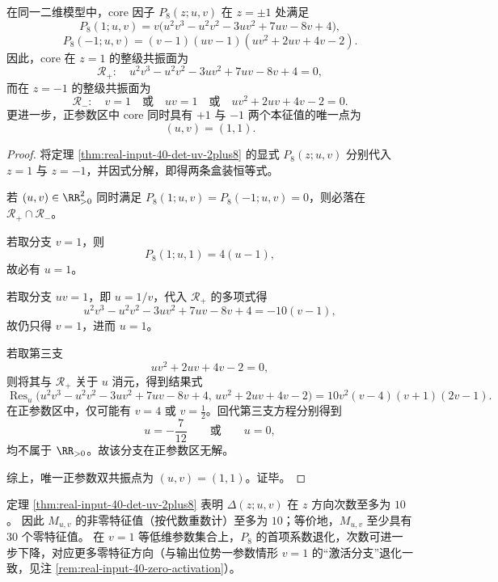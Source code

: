 \begin{theorem}[core 在 \texorpdfstring{$z=\pm1$}{z=±1} 的整级共振面与唯一正双共振点]\label{thm:real-input-40-zeta-uv-core-zpmone-resonance-surfaces}
在同一二维模型中，core 因子 \(P_8(z;u,v)\) 在 \(z=\pm1\) 处满足
\[
\boxed{\;
P_8(1;u,v)
=
v\bigl(u^2v^3-u^2v^2-3uv^2+7uv-8v+4\bigr),
\;}
\]
\[
\boxed{\;
P_8(-1;u,v)
=
(v-1)(uv-1)(uv^2+2uv+4v-2).
\;}
\]
因此，core 在 \(z=1\) 的整级共振面为
\[
\mathcal R_+:\quad
u^2v^3-u^2v^2-3uv^2+7uv-8v+4=0,
\]
而在 \(z=-1\) 的整级共振面为
\[
\mathcal R_-:\quad
v=1
\quad\text{或}\quad
uv=1
\quad\text{或}\quad
uv^2+2uv+4v-2=0.
\]
更进一步，正参数区中 core 同时具有 \(+1\) 与 \(-1\) 两个本征值的唯一点为
\[
\boxed{\;
(u,v)=(1,1).\;}
\]
\end{theorem}
\begin{proof}
将定理 \ref{thm:real-input-40-det-uv-2plus8} 的显式 \(P_8(z;u,v)\) 分别代入 \(z=1\) 与 \(z=-1\)，并因式分解，即得两条盒装恒等式。

若 \((u,v)\in\RR_{>0}^2\) 同时满足 \(P_8(1;u,v)=P_8(-1;u,v)=0\)，则必落在 \(\mathcal R_+\cap\mathcal R_-\)。

若取分支 \(v=1\)，则
\[
P_8(1;u,1)=4(u-1),
\]
故必有 \(u=1\)。

若取分支 \(uv=1\)，即 \(u=1/v\)，代入 \(\mathcal R_+\) 的多项式得
\[
u^2v^3-u^2v^2-3uv^2+7uv-8v+4
=
-10(v-1),
\]
故仍只得 \(v=1\)，进而 \(u=1\)。

若取第三支
\[
uv^2+2uv+4v-2=0,
\]
则将其与 \(\mathcal R_+\) 关于 \(u\) 消元，得到结果式
\[
\operatorname{Res}_u\!\bigl(
u^2v^3-u^2v^2-3uv^2+7uv-8v+4,\,
uv^2+2uv+4v-2
\bigr)
=
10v^2(v-4)(v+1)(2v-1).
\]
在正参数区中，仅可能有 \(v=4\) 或 \(v=\tfrac12\)。回代第三支方程分别得到
\[
u=-\frac{7}{12}
\qquad\text{或}\qquad
u=0,
\]
均不属于 \(\RR_{>0}\)。故该分支在正参数区无解。

综上，唯一正参数双共振点为 \((u,v)=(1,1)\)。证毕。
\end{proof}

\begin{remark}[有效谱维数与零特征值重数]\label{rem:real-input-40-zeta-uv-effective-spectrum}
定理 \ref{thm:real-input-40-det-uv-2plus8} 表明 $\Delta(z;u,v)$ 在 $z$ 方向次数至多为 $10$。
因此 $M_{u,v}$ 的非零特征值（按代数重数计）至多为 $10$；等价地，$M_{u,v}$ 至少具有 $30$ 个零特征值。
在 $v=1$ 等低维参数集合上，$P_8$ 的首项系数退化，次数可进一步下降，对应更多零特征方向（与输出位势一参数情形 $v=1$ 的“激活分支”退化一致，见注 \ref{rem:real-input-40-zero-activation}）。
\end{remark}

